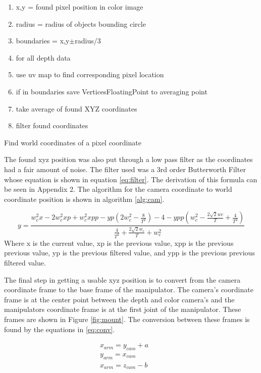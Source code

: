  \begin{algorithm}
 	\begin{enumerate}
 		\item x,y = found pixel position in color image
 		\item radius = radius of objects bounding circle
 		\item boundaries = x,y$\pm$radius/3
 		\item for all depth data
 		\item use uv map to  find corresponding pixel location
 		\item if in boundaries save VerticesFloatingPoint to averaging point
 		\item take average of found XYZ coordinates 
 		\item filter found  coordinates
 	\end{enumerate}
 \caption{Find world coordinates of a pixel coordinate}
 \label{alg:cam}
 \end{algorithm}
 
 The found xyz position was also put through a low pass filter as the coordinates had a fair amount of noise. The filter used was a 3rd order Butterworth Filter whose equation is shown in equation \ref{eq:filter}. The derivation of this formula can be seen in Appendix 2. The algorithm for the camera coordinate to world coordinate position is shown in algorithm \ref{alg:cam}.

\begin{equation}
\label{eq:filter}
y = \frac{w_c^2x-2w_c^2xp+w_c^2xpp-yp(2w_c^2-\frac{8}{T^2})-4-ypp(w_c^2-\frac{2\sqrt{2}wc}{T}+\frac{4}{T^2})}{\frac{4}{T^2}+\frac{2\sqrt{2}w_c}{T}+w_c^2} 
\end{equation}
Where x is the current value, xp is the previous value, xpp is the previous previous value, yp is the previous filtered value, and ypp is the previous previous filtered value.

The final step in getting a usable xyz position is to convert from the camera coordinate frame to the base frame of the manipulator. The camera's coordinate frame is at the center point between the depth and color camera's and the manipulators coordinate frame is at the first joint of the manipulator. These frames are shown in Figure \ref{fig:mount}. The conversion between these frames is found by the equations in  \ref{eq:conv}.

\begin{subequations}
\label{eq:conv}
	\begin{align}
	x_{arm} = y_{cam} + a \qquad \\
	y_{arm} = x_{cam}  \qquad \\
	x_{arm} = z_{cam} - b 
	\end{align}
\end{subequations}

